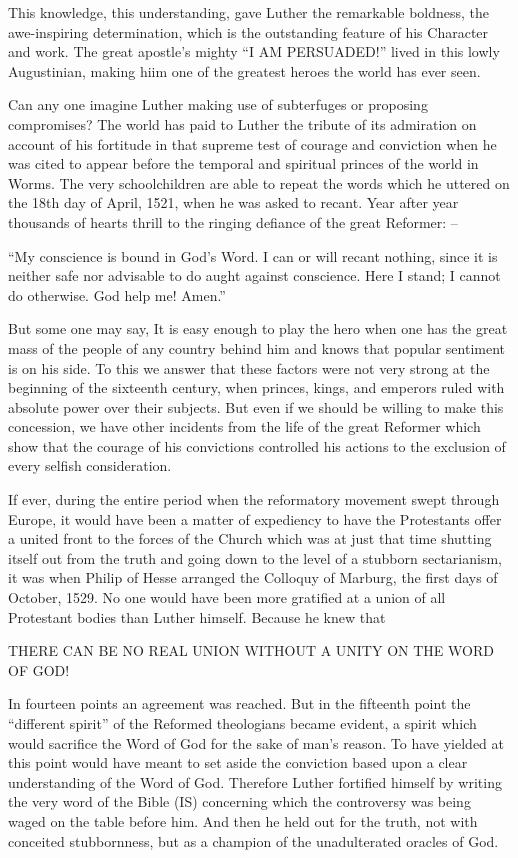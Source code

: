 \documentclass[
]{book}
\begin{document}
This knowledge, this understanding, gave Luther the remarkable boldness, the awe-inspiring determination, which is the outstanding feature of his Character and work. The great apostle's mighty ``I AM PERSUADED!'' lived in this lowly Augustinian, making hiim one of the greatest heroes the world has ever seen.

Can any one imagine Luther making use of subterfuges or proposing compromises? The world has paid to Luther the tribute of its admiration on account of his fortitude in that supreme test of courage and conviction when he was cited to appear before the temporal and spiritual princes of the world in Worms. The very schoolchildren are able to repeat the words which he uttered on the 18th day of April, 1521, when he was asked to recant. Year after year thousands of hearts thrill to the ringing defiance of the great Reformer: --

``My conscience is bound in God's Word. I can or will recant nothing, since it is neither safe nor advisable to do aught against conscience. Here I stand; I cannot do otherwise. God help me! Amen.''

But some one may say, It is easy enough to play the hero when one has the great mass of the people of any country behind him and knows that popular sentiment is on his side. To this we answer that these factors were not very strong at the beginning of the sixteenth century, when princes, kings, and emperors ruled with absolute power over their subjects. But even if we should be willing to make this concession, we have other incidents from the life of the great Reformer which show that the courage of his convictions controlled his actions to the exclusion of every selfish consideration.

If ever, during the entire period when the reformatory movement swept through Europe, it would have been a matter of expediency to have the Protestants offer a united front to the forces of the Church which was at just that time shutting itself out from the truth and going down to the level of a stubborn sectarianism, it was when Philip of Hesse arranged the Colloquy of Marburg, the first days of October, 1529. No one would have been more gratified at a union of all Protestant bodies than Luther himself. Because he knew that

\begin{center} THERE CAN BE NO REAL UNION WITHOUT A UNITY ON THE WORD OF GOD! \end{center}

In fourteen points an agreement was reached. But in the fifteenth point the ``different spirit'' of the Reformed theologians became evident, a spirit which would sacrifice the Word of God for the sake of man's reason. To have yielded at this point would have meant to set aside the conviction based upon a clear understanding of the Word of God. Therefore Luther fortified himself by writing the very word of the Bible (IS) concerning which the controversy was being waged on the table before him. And then he held out for the truth, not with conceited stubbornness, but as a champion of the unadulterated oracles of God.
\end{document}
